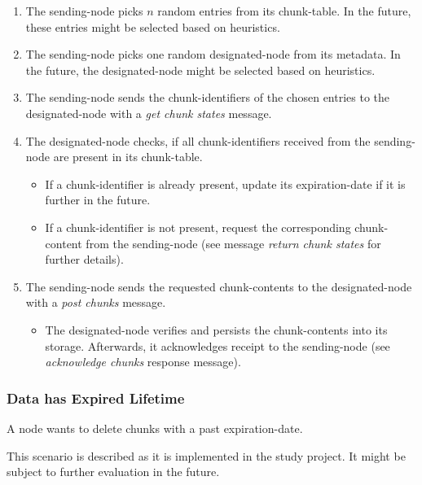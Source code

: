 \begin{enumerate}
    \item The \gls{sending-node} picks $n$ random entries from its \gls{chunk-table}. In the future, these entries might be selected based on heuristics.
    \item The \gls{sending-node} picks one random \gls{designated-node} from its \gls{metadata}. In the future, the \gls{designated-node} might be selected based on heuristics.
    \item The \gls{sending-node} sends the \glspl{chunk-identifier} of the chosen entries to the \gls{designated-node} with a \emph{get chunk states} message.
    \item The \gls{designated-node} checks, if all \glspl{chunk-identifier} received from the \gls{sending-node} are present in its \gls{chunk-table}.
        \begin{itemize}
            \item If a \gls{chunk-identifier} is already present, update its \gls{expiration-date} if it is further in the future.
            \item If a \gls{chunk-identifier} is not present, request the corresponding \gls{chunk-content} from the \gls{sending-node} (see message \emph{return chunk states} for further details).
        \end{itemize}
    \item The \gls{sending-node} sends the requested \glspl{chunk-content} to the \gls{designated-node} with a \emph{post chunks} message.
        \begin{itemize}
            \item The \gls{designated-node} verifies and persists the \glspl{chunk-content} into its \gls{storage}. Afterwards, it acknowledges receipt to the \gls{sending-node} (see \emph{acknowledge chunks} response message).
        \end{itemize}
\end{enumerate}

\subsubsection{Data has Expired Lifetime}\label{sec:scenario-data-expiration}
A \gls{node} wants to delete \glspl{chunk} with a past \gls{expiration-date}.

This scenario is described as it is implemented in the study project. It might be subject to further evaluation in the future.

